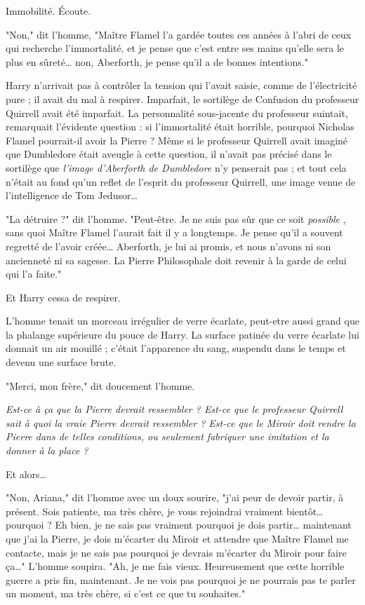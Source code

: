Immobilité. Écoute.

"Non," dit l'homme, "Maître Flamel l'a gardée toutes ces années à l'abri de ceux qui recherche l'immortalité, et je pense que c'est entre ses mains qu'elle sera le plus en sûreté… non, Aberforth, je pense qu'il a de bonnes intentions."

Harry n'arrivait pas à contrôler la tension qui l'avait saisie, comme de l'électricité pure ; il avait du mal à respirer. Imparfait, le sortilège de Confusion du professeur Quirrell avait été imparfait. La personnalité sous-jacente du professeur suintait, remarquait l'évidente question : si l'immortalité était horrible, pourquoi Nicholas Flamel pourrait-il avoir la Pierre ? Même si le professeur Quirrell avait imaginé que Dumbledore était aveugle à cette question, il n'avait pas précisé dans le sortilège que \emph{l'image d'Aberforth de Dumbledore}  n'y penserait pas ; et tout cela n'était au fond qu'un reflet de l'esprit du professeur Quirrell, une image venue de l'intelligence de Tom Jedusor…

"La détruire ?" dit l'homme. "Peut-être. Je ne suis pas sûr que ce soit \emph{possible} , sans quoi Maître Flamel l'aurait fait il y a longtemps. Je pense qu'il a souvent regretté de l'avoir créée… Aberforth, je lui ai promis, et nous n'avons ni son ancienneté ni sa sagesse. La Pierre Philosophale doit revenir à la garde de celui qui l'a faite."

Et Harry cessa de respirer.

L'homme tenait un morceau irrégulier de verre écarlate, peut-etre aussi grand que la phalange supérieure du pouce de Harry. La surface patinée du verre écarlate lui donnait un air mouillé ; c'était l'apparence du sang, suspendu dans le temps et devenu une surface brute.

"Merci, mon frère," dit doucement l'homme.

\emph{Est-ce à ça que la Pierre devrait ressembler ? Est-ce que le professeur Quirrell sait à quoi la vraie Pierre devrait ressembler ? Est-ce que le Miroir doit rendre la Pierre dans de telles conditions, ou seulement fabriquer une imitation et la donner à la place ?} 

Et alors…

"Non, Ariana," dit l'homme avec un doux sourire, "j'ai peur de devoir partir, à présent. Sois patiente, ma très chère, je vous rejoindrai vraiment bientôt… pourquoi ? Eh bien, je ne sais pas vraiment pourquoi je dois partir… maintenant que j'ai la Pierre, je dois m'écarter du Miroir et attendre que Maître Flamel me contacte, mais je ne sais pas pourquoi je devrais m'écarter du Miroir pour faire ça…" L'homme soupira. "Ah, je me fais vieux. Heureusement que cette horrible guerre a pris fin, maintenant. Je ne vois pas pourquoi je ne pourrais pas te parler un moment, ma très chère, si c'est ce que tu souhaites."


